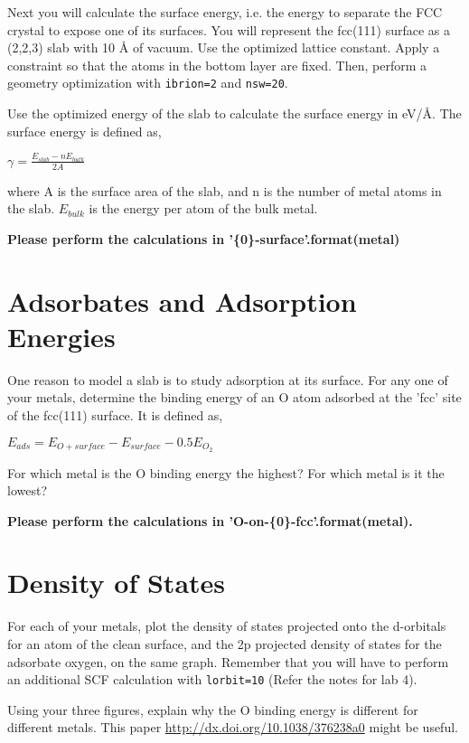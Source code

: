 \documentclass[11pt]{article}
\begin{document}
Next you will calculate the surface energy, i.e. the energy to separate the FCC crystal to expose one of its surfaces. You will represent the fcc(111) surface as a (2,2,3) slab with 10 \AA{} of vacuum. Use the optimized lattice constant. Apply a constraint so that the atoms in the bottom layer are fixed. Then, perform a geometry optimization with \verb~ibrion=2~ and \verb~nsw=20~.

Use the optimized energy of the slab to calculate the surface energy in eV/\AA{}. The surface energy is defined as,

$\gamma = \frac{E_{slab} - nE_{bulk}}{2A}$

where A is the surface area of the slab, and n is the number of metal atoms in the slab. $E_{bulk}$ is the energy per atom of the bulk metal.

\textbf{Please perform the calculations in '\{0\}-surface'.format(metal)}

\section{Adsorbates and Adsorption Energies}
\label{sec-6}

One reason to model a slab is to study adsorption at its surface.  For any one of your metals, determine the binding energy of an O atom adsorbed at the 'fcc' site of the fcc(111) surface. It is defined as,

$E_{ads} = E_{O+surface} - E_{surface} - 0.5 E_{O_{2}}$

For which metal is the O binding energy the highest? For which metal is it the lowest?

\textbf{Please perform the calculations in 'O-on-\{0\}-fcc'.format(metal).}

\section{Density of States}
\label{sec-7}
For each of your metals, plot the density of states projected onto the d-orbitals for an atom of the clean surface, and the 2p projected density of states for the adsorbate oxygen, on the same graph. Remember that you will have to perform an additional SCF calculation with \verb~lorbit=10~ (Refer the notes for lab 4).

Using your three figures, explain why the O binding energy is different for different metals. This paper \url{http://dx.doi.org/10.1038/376238a0} might be useful.
\end{document}

